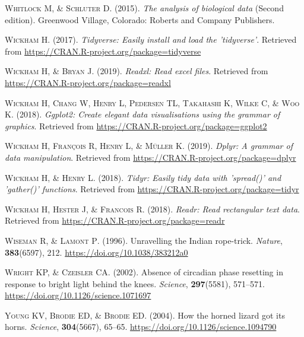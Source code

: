 \documentclass[a4paperpaper,]{article}
\begin{document}
\leavevmode\hypertarget{ref-whitlock2015}{}%
\textsc{Whitlock M, \& Schluter D}. (2015). \emph{The analysis of biological data} (Second edition). Greenwood Village, Colorado: Roberts and Company Publishers.

\leavevmode\hypertarget{ref-R-tidyverse}{}%
\textsc{Wickham H}. (2017). \emph{Tidyverse: Easily install and load the 'tidyverse'}. Retrieved from \url{https://CRAN.R-project.org/package=tidyverse}

\leavevmode\hypertarget{ref-R-readxl}{}%
\textsc{Wickham H, \& Bryan J}. (2019). \emph{Readxl: Read excel files}. Retrieved from \url{https://CRAN.R-project.org/package=readxl}

\leavevmode\hypertarget{ref-R-ggplot2}{}%
\textsc{Wickham H, Chang W, Henry L, Pedersen TL, Takahashi K, Wilke C, \& Woo K}. (2018). \emph{Ggplot2: Create elegant data visualisations using the grammar of graphics}. Retrieved from \url{https://CRAN.R-project.org/package=ggplot2}

\leavevmode\hypertarget{ref-R-dplyr}{}%
\textsc{Wickham H, François R, Henry L, \& Müller K}. (2019). \emph{Dplyr: A grammar of data manipulation}. Retrieved from \url{https://CRAN.R-project.org/package=dplyr}

\leavevmode\hypertarget{ref-R-tidyr}{}%
\textsc{Wickham H, \& Henry L}. (2018). \emph{Tidyr: Easily tidy data with 'spread()' and 'gather()' functions}. Retrieved from \url{https://CRAN.R-project.org/package=tidyr}

\leavevmode\hypertarget{ref-R-readr}{}%
\textsc{Wickham H, Hester J, \& Francois R}. (2018). \emph{Readr: Read rectangular text data}. Retrieved from \url{https://CRAN.R-project.org/package=readr}

\leavevmode\hypertarget{ref-wiseman1996}{}%
\textsc{Wiseman R, \& Lamont P}. (1996). Unravelling the Indian rope-trick. \emph{Nature}, \textbf{383}(6597), 212. \url{https://doi.org/10.1038/383212a0}

\leavevmode\hypertarget{ref-Wright2002}{}%
\textsc{Wright KP, \& Czeisler CA}. (2002). Absence of circadian phase resetting in response to bright light behind the knees. \emph{Science}, \textbf{297}(5581), 571--571. \url{https://doi.org/10.1126/science.1071697}

\leavevmode\hypertarget{ref-Young2004}{}%
\textsc{Young KV, Brodie ED, \& Brodie ED}. (2004). How the horned lizard got its horns. \emph{Science}, \textbf{304}(5667), 65--65. \url{https://doi.org/10.1126/science.1094790}
\end{document}

